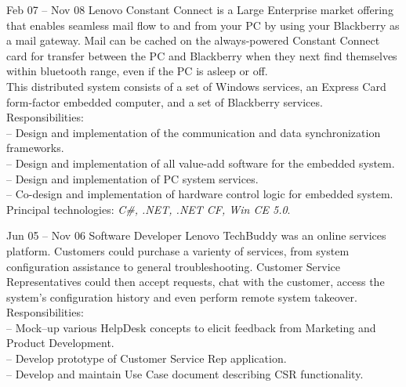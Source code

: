 \documentclass[letterpaper, 11pt]{article}
\begin{document}
\begin{resume}
\begin{block}
\begin{subcategory}{Feb 07 -- Nov 08}
                Lenovo Constant Connect is a Large Enterprise market offering that enables
                seamless mail flow to and from your PC by using your Blackberry as a mail
                gateway.  Mail can be cached on the always-powered Constant Connect card for
                transfer between the PC and Blackberry when they next find themselves within
                bluetooth range, even if the PC is asleep or off.
                \\[1ex]
                This distributed system consists of a set of Windows services, an Express Card
                form-factor embedded computer, and a set of Blackberry services.
                \\[1ex]
                Responsibilities: \\
                -- Design and implementation of the communication and data synchronization frameworks. \\
                -- Design and implementation of all value-add software for the embedded system. \\
                -- Design and implementation of PC system services. \\
                -- Co-design and implementation of hardware control logic for embedded system.
                \\[1ex]
                Principal technologies: \emph{C\#, .NET, .NET CF, Win CE 5.0}.
                \bigskip
            \end{subcategory}
            \begin{subcategory}{Jun 05 -- Nov 06}
                 {Software Developer}
                Lenovo TechBuddy was an online services platform.  Customers could purchase
                a varienty of services, from system configuration assistance to general
                troubleshooting.  Customer Service Representatives could then accept requests,
                chat with the customer, access the system's configuration history and even
                perform remote system takeover.
                \\[1ex]
                Responsibilities: \\
                -- Mock--up various HelpDesk concepts to elicit feedback from Marketing and Product Development. \\
                -- Develop prototype of Customer Service Rep application. \\
                -- Develop and maintain Use Case document describing CSR functionality.

\end{subcategory}
\end{block}
\end{resume}
\end{document}
